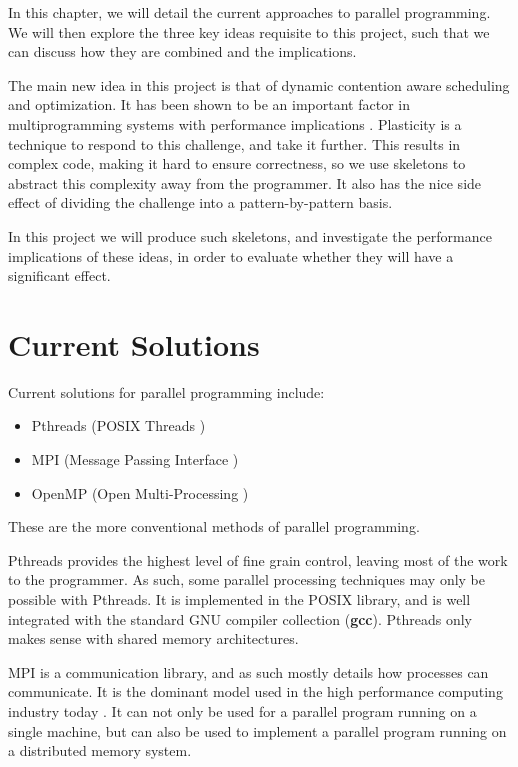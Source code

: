 
In this chapter, we will detail the current approaches to parallel programming. We will then explore the three key ideas requisite to this project, such that we can discuss how they are combined and the implications.

The main new idea in this project is that of dynamic contention aware scheduling and optimization. It has been shown to be an important factor in multiprogramming systems with performance implications \cite{lira}. Plasticity is a technique to respond to this challenge, and take it further. This results in complex code, making it hard to ensure correctness, so we use skeletons to abstract this complexity away from the programmer. It also has the nice side effect of dividing the challenge into a pattern-by-pattern basis.

In this project we will produce such skeletons, and investigate the performance implications of these ideas, in order to evaluate whether they will have a significant effect.



\section{Current Solutions}

Current solutions for parallel programming include:

\begin{itemize}
	\item Pthreads (POSIX Threads \cite{posix_threads})
	\item MPI 	   (Message Passing Interface \cite{mpi})
	\item OpenMP   (Open Multi-Processing \cite{openmp_home} \cite{openmp})
\end{itemize}

These are the more conventional methods of parallel programming.

Pthreads provides the highest level of fine grain control, leaving most of the work to the programmer. As such, some parallel processing techniques may only be possible with Pthreads. It is implemented in the POSIX library, and is well integrated with the standard GNU compiler collection (\textbf{gcc}). Pthreads only makes sense with shared memory architectures.

MPI is a communication library, and as such mostly details how processes can communicate. It is the dominant model used in the high performance computing industry today \cite{mpi}. It can not only be used for a parallel program running on a single machine, but can also be used to implement a parallel program running on a distributed memory system.

